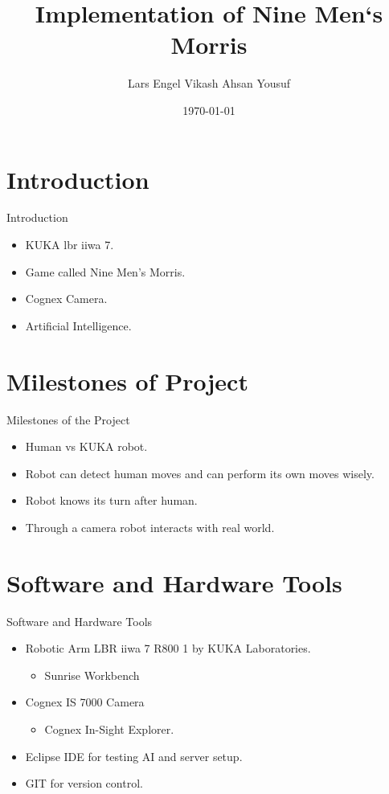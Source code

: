 \documentclass{beamer}
\title{Implementation of Nine Men`s Morris}
\author{Lars Engel \newline Vikash \newline Ahsan Yousuf}
\institute{Fachhochschule Kiel}
\date{\today}
\begin{document}

\begin{frame}
\titlepage
\end{frame}


\section{Introduction}
\begin{frame}{Introduction }
\begin{itemize}
\item KUKA lbr iiwa 7.
\item Game called Nine Men's Morris.
\item Cognex Camera.
\item Artificial Intelligence.
\end{itemize}
\end{frame}

\section{Milestones of Project}
\begin{frame}{Milestones of the Project}
\begin{itemize}
\item Human vs KUKA robot.  
\item Robot can detect human moves and can perform its own moves wisely.
\item Robot knows its turn after human.
\item Through a camera robot interacts with real world.
\end{itemize}
\end{frame}

\section{Software and Hardware Tools}
\begin{frame}{Software and Hardware Tools}
\begin{itemize}
\item Robotic Arm LBR iiwa 7 R800 1 by KUKA Laboratories.
\begin{itemize}
\item Sunrise Workbench
\end{itemize}
\item Cognex IS 7000 Camera
\begin{itemize}
\item Cognex In-Sight Explorer.
\end{itemize}
\vspace{\baselineskip}
\item Eclipse IDE for testing AI and server setup.
\item GIT for version control.
\end{itemize}
\end{frame}
\end{document}
